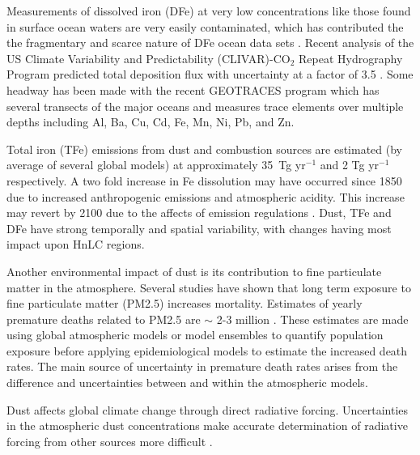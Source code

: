 Measurements of dissolved iron (DFe) at very low concentrations like those found in surface ocean waters are very easily contaminated, which has contributed the the fragmentary and scarce nature of DFe ocean data sets \cite{Rijkenberg_2014}.
Recent analysis of the US Climate Variability and Predictability (CLIVAR)-CO$_{2}$ Repeat Hydrography Program predicted total deposition flux with uncertainty at a factor of 3.5 \cite{Grand_2015}.
Some headway has been made with the recent GEOTRACES program which has several transects of the major oceans and measures trace elements over multiple depths including Al, Ba, Cu, Cd, Fe, Mn, Ni, Pb, and Zn.
  
Total iron (TFe) emissions from dust and combustion sources are estimated (by average of several global models) at approximately 35~Tg yr$^{-1}$ and 2 Tg yr$^{-1}$ respectively. A two fold increase in Fe dissolution may have occurred since 1850 due to increased anthropogenic emissions and atmospheric acidity.
This increase may revert by 2100 due to the affects of emission regulations \cite{Myriokefalitakis_2015}.
Dust, TFe and DFe have strong temporally and spatial variability, with changes having most impact upon HnLC regions.

Another environmental impact of dust is its contribution to fine particulate matter in the atmosphere.
Several studies have shown that long term exposure to fine particulate matter (PM2.5) increases mortality. 
Estimates of yearly premature deaths related to PM2.5 are $\sim$ 2-3 million \cite{Hoek_2013, 19627030, Silva_2013, Lelieveld_2015}.   
These estimates are made using global atmospheric models or model ensembles to quantify population exposure before applying epidemiological models to estimate the increased death rates.
The main source of uncertainty in premature death rates arises from the difference and uncertainties between and within the atmospheric models.

Dust affects global climate change through direct radiative forcing.
Uncertainties in the atmospheric dust concentrations make accurate determination of radiative forcing from other sources more difficult \cite{IPCC_2013_chap8}.
